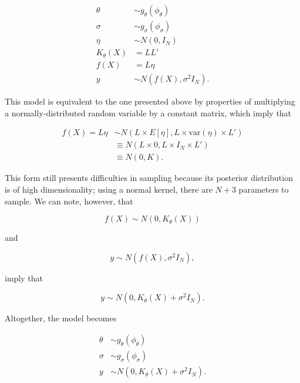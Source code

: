 \documentclass{article}
\begin{document}
\begin{subequations}
\begin{align}
	\label{eq:GPChol:theta} \theta &\sim g_\theta(\phi_\theta)\\ 
	\label{eq:GPChol:sigma} \sigma &\sim g_\sigma(\phi_\sigma)\\ 
	\label{eq:GPChol:eta} \eta &\sim N(0, I_N)\\
	\label{eq:GPChol:K} K_\theta(X) &= LL'\\
	\label{eq:GPChol:f} f(X) &= L\eta\\ 
	\label{eq:GPChol:y} y &\sim N(f(X), \sigma^2 I_N). 
\end{align}
\end{subequations}

\noindent This model is equivalent to the one presented above by properties of multiplying a normally-distributed random variable by a constant matrix, which imply that

\begin{subequations}
\begin{align}
	f(X) = L\eta &\sim N(L\times E[\eta], L\times \mbox{var}(\eta)\times L')\\ 
	&\equiv N(L\times 0, L\times I_N \times L')\\ 
	&\equiv N(0, K).
\end{align}
\end{subequations}

This form still presents difficulties in sampling because its posterior distribution is of high dimensionality; using a normal kernel, there are $N + 3$ parameters to sample. We can note, however, that

\begin{equation}
	f(X) \sim N(0, K_\theta(X))
\end{equation}

\noindent and

\begin{equation}
	y \sim N(f(X), \sigma^2 I_N),
\end{equation}

\noindent imply that

\begin{equation}
	y \sim N(0, K_\theta(X) + \sigma^2 I_N).
\end{equation}

\noindent Altogether, the model becomes

\begin{subequations}
\begin{align}
	\label{eq:GPFinal:theta} \theta &\sim g_\theta(\phi_\theta)\\ 
	\label{eq:GPFinal:sigma} \sigma &\sim g_\sigma(\phi_\sigma)\\ 
	\label{eq:GPFinal:y} y &\sim N(0, K_\theta(X) + \sigma^2 I_N). 
\end{align}
\end{subequations}
\end{document}
